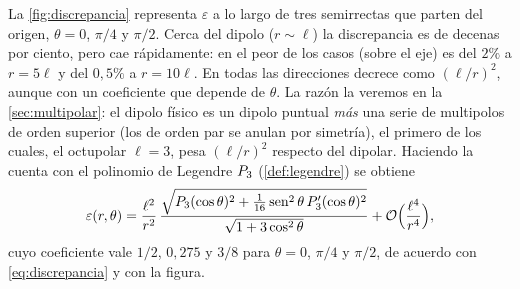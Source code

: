 \begin{observacion}\label{obs:discrepancia}
La \cref{fig:discrepancia} representa $\varepsilon$ a lo largo de tres semirrectas que parten del origen, $\theta=0$, $\pi/4$ y $\pi/2$. Cerca del
dipolo ($r\sim\ell$) la discrepancia es de decenas por ciento, pero cae rápidamente: en el peor de los casos (sobre el eje) es del $2\%$ a
$r=5\ell$ y del $0{,}5\%$ a $r=10\ell$. En todas las direcciones decrece como $(\ell/r)^{2}$, aunque con un coeficiente que depende de $\theta$. La
razón la veremos en la \cref{sec:multipolar}: el dipolo físico es un dipolo puntual \emph{más} una serie de multipolos de orden superior
(los de orden par se anulan por simetría), el primero de los cuales, el octupolar $\ell=3$, pesa $(\ell/r)^{2}$ respecto del dipolar. Haciendo la
cuenta con el polinomio de Legendre $P_{3}$ (\cref{def:legendre}) se obtiene
\[
  \varepsilon(r,\theta)=\frac{\ell^{2}}{r^{2}}\,\frac{\sqrt{P_{3}(\cos\theta)^{2}+\frac{1}{16}\operatorname{sen}^{2}\theta\,P_{3}'(\cos\theta)^{2}}}{\sqrt{1+3\cos^{2}\theta}}
  +\mathcal{O}\Bigl(\frac{\ell^{4}}{r^{4}}\Bigr),
\]
cuyo coeficiente vale $1/2$, $0{,}275$ y $3/8$ para $\theta=0$, $\pi/4$ y $\pi/2$, de acuerdo con \cref{eq:discrepancia} y con la figura.
\end{observacion}



